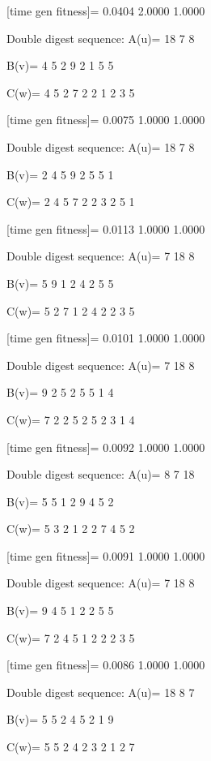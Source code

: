 [time gen fitness]=
    0.0404    2.0000    1.0000

Double digest sequence:
A(u)=
    18     7     8

B(v)=
     4     5     2     9     2     1     5     5

C(w)=
     4     5     2     7     2     2     1     2     3     5

[time gen fitness]=
    0.0075    1.0000    1.0000

Double digest sequence:
A(u)=
    18     7     8

B(v)=
     2     4     5     9     2     5     5     1

C(w)=
     2     4     5     7     2     2     3     2     5     1

[time gen fitness]=
    0.0113    1.0000    1.0000

Double digest sequence:
A(u)=
     7    18     8

B(v)=
     5     9     1     2     4     2     5     5

C(w)=
     5     2     7     1     2     4     2     2     3     5

[time gen fitness]=
    0.0101    1.0000    1.0000

Double digest sequence:
A(u)=
     7    18     8

B(v)=
     9     2     5     2     5     5     1     4

C(w)=
     7     2     2     5     2     5     2     3     1     4

[time gen fitness]=
    0.0092    1.0000    1.0000

Double digest sequence:
A(u)=
     8     7    18

B(v)=
     5     5     1     2     9     4     5     2

C(w)=
     5     3     2     1     2     2     7     4     5     2

[time gen fitness]=
    0.0091    1.0000    1.0000

Double digest sequence:
A(u)=
     7    18     8

B(v)=
     9     4     5     1     2     2     5     5

C(w)=
     7     2     4     5     1     2     2     2     3     5

[time gen fitness]=
    0.0086    1.0000    1.0000

Double digest sequence:
A(u)=
    18     8     7

B(v)=
     5     5     2     4     5     2     1     9

C(w)=
     5     5     2     4     2     3     2     1     2     7

